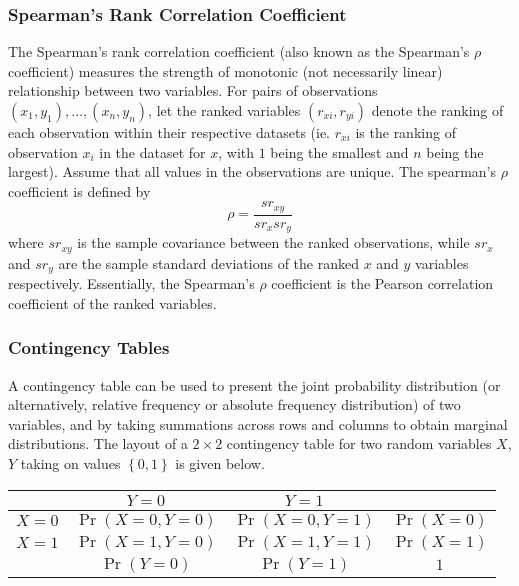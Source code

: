 \documentclass[11pt]{report} %
\begin{document}
\subsubsection{Spearman's Rank Correlation Coefficient}

The Spearman's rank correlation coefficient (also known as the Spearman's $\rho$ coefficient) measures the strength of monotonic (not necessarily linear) relationship between two variables. For pairs of observations $\left(x_{1}, y_{1}\right), \dots, \left(x_{n}, y_{n}\right)$, let the ranked variables $\left(r_{xi}, r_{yi}\right)$ denote the ranking of each observation within their respective datasets (ie. $r_{xi}$ is the ranking of observation $x_{i}$ in the dataset for $x$, with $1$ being the smallest and $n$ being the largest). Assume that all values in the observations are unique. The spearman's $\rho$ coefficient is defined by
\begin{equation}
\rho = \dfrac{sr_{xy}}{sr_{x}sr_{y}}
\end{equation}
where $sr_{xy}$ is the sample covariance between the ranked observations, while $sr_{x}$ and $sr_{y}$ are the sample standard deviations of the ranked $x$ and $y$ variables respectively. Essentially, the Spearman's $\rho$ coefficient is the Pearson correlation coefficient of the ranked variables.

\subsubsection{Contingency Tables}

A contingency table can be used to present the joint probability distribution (or alternatively, relative frequency or absolute frequency distribution) of two variables, and by taking summations across rows and columns to obtain marginal distributions. The layout of a $2\times 2$ contingency table for two random variables $X$, $Y$ taking on values $\left\{0, 1\right\}$ is given below.
\begin{table}[H]\centering
\begin{tabular}{|c||c|c|c|}
\hline 
 & $Y = 0$ & $Y = 1$ & \\
\hline 
\hline 
$X = 0$ & $\operatorname{Pr}\left(X = 0, Y = 0\right)$ &  $\operatorname{Pr}\left(X = 0, Y = 1\right)$ & $\operatorname{Pr}\left(X = 0\right)$ \\
\hline 
$X = 1$ & $\operatorname{Pr}\left(X = 1, Y = 0\right)$ & $\operatorname{Pr}\left(X = 1, Y = 1\right)$ & $\operatorname{Pr}\left(X = 1\right)$ \\
\hline 
 & $\operatorname{Pr}\left(Y = 0\right)$ & $\operatorname{Pr}\left(Y = 1\right)$ & $1$ \\
 \hline
\end{tabular}
\end{table}
\end{document}

